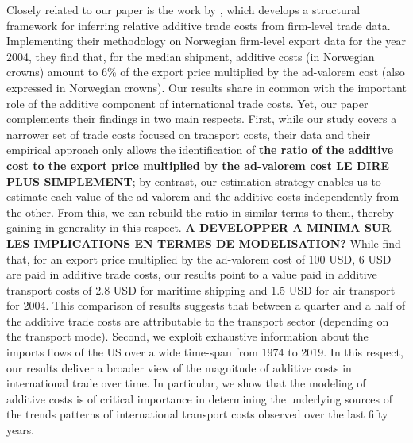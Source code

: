 \documentclass[a4paper,11pt]{article}
\begin{document}
Closely related to our paper is the work by \cite{Irrazabal_2015}, which develops a structural framework for inferring relative additive trade costs from firm-level trade data.
Implementing their methodology on Norwegian firm-level export data for the year 2004, they find that, for the median shipment, additive costs (in Norwegian crowns) amount to 6\% of the export price multiplied by the ad-valorem cost (also expressed in Norwegian crowns).
Our results share in common with \cite{Irrazabal_2015} the important role of the additive component of international trade costs.
Yet, our paper complements their findings in two main respects.
First, while our study covers a narrower set of trade costs focused on transport costs, their data and their empirical approach only allows the identification of \textbf{the ratio of the additive cost to the export price multiplied by the ad-valorem cost LE DIRE PLUS SIMPLEMENT}; by contrast, our estimation strategy enables us to estimate each value of the ad-valorem and the additive costs independently from the other. From this, we can rebuild the ratio in similar terms to them, thereby gaining in generality in this respect. \textbf{A DEVELOPPER A MINIMA SUR LES IMPLICATIONS EN TERMES DE MODELISATION?}
While \cite{Irrazabal_2015} find that, for an export price multiplied by the ad-valorem cost of 100 USD, 6 USD are paid in additive trade costs, our results point to a value paid in additive transport costs of 2.8 USD for maritime shipping and 1.5 USD for air transport for 2004.
This comparison of results suggests that between a quarter and a half of the additive trade costs are attributable to the transport sector (depending on the transport mode).%
Second, we exploit exhaustive information about the imports flows of the US over a wide time-span from 1974 to 2019.
In this respect, our results deliver a broader view of the magnitude of additive costs in international trade over time.
In particular, we show that the modeling of additive costs is of critical importance in determining the underlying sources of the trends patterns of international transport costs observed over the last fifty years.
\end{document}
